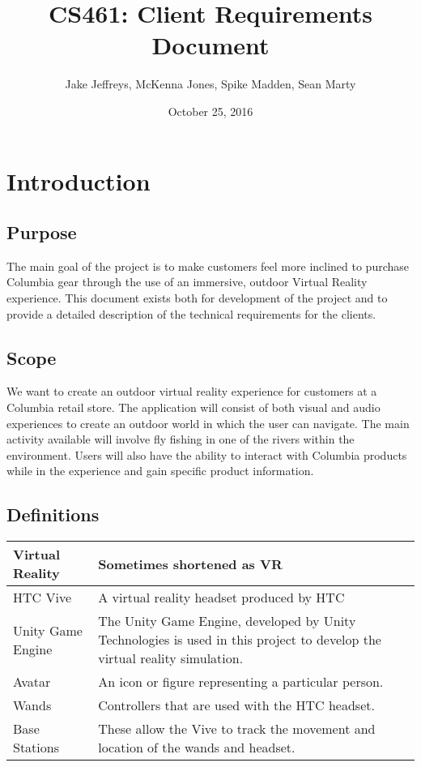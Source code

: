 \documentclass[10pt,journal,compsoc,onecolumn]{IEEEtran}
\title{CS461: Client Requirements Document}
\author{Jake Jeffreys, McKenna Jones, Spike Madden, Sean Marty}
\date{October 25, 2016}
\begin{document}
\begin{titlepage}
\maketitle
\vspace{3cm}

\end{titlepage}

\tableofcontents
\clearpage
\section{Introduction}

\subsection{Purpose}
The main goal of the project is to make customers feel more inclined to purchase
Columbia gear through the use of an immersive, outdoor Virtual Reality
experience. This document exists both for development of the project and to provide a detailed description of the technical requirements for the clients.

\subsection{Scope}
We want to create an outdoor virtual reality experience for customers at a
Columbia retail store. The application will consist of both visual and audio
experiences to create an outdoor world in which the user can navigate. The main
activity available will involve fly fishing in one of the rivers within the
environment. Users will also have the ability to interact with Columbia products
while in the experience and gain specific product information.

\subsection{Definitions}
\begin{center}
	\begin{tabular}{| m{3cm} | m{9cm} |}
		\hline
		Virtual Reality & Sometimes shortened as VR \\
		\hline
		HTC Vive & A virtual reality headset produced by HTC \\
		\hline
		Unity Game Engine & The Unity Game Engine, developed by Unity
		Technologies is used in this project to develop the virtual reality simulation. \\
    	\hline
    	Avatar & An icon or figure representing a particular person. \\
    	\hline
    	Wands & Controllers that are used with the HTC headset. \\
    	\hline
		Base Stations & These allow the Vive to track the movement and location of the wands and headset. \\
		\hline
	\end{tabular}
\end{center}
\end{document}
